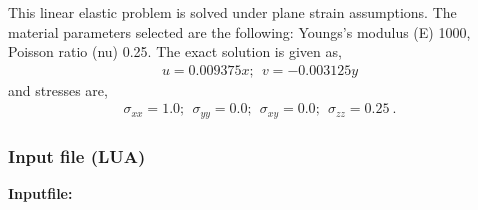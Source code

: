 This linear elastic problem is solved under
plane strain assumptions. The material parameters
selected are the following: Youngs's modulus (E)
1000, Poisson ratio (nu) 0.25. The exact solution 
is given as,
\begin{eqnarray}
  u = 0.009375x; ~~ v=-0.003125y \nonumber
\end{eqnarray} 
and stresses are,
\begin{eqnarray}
  \sigma_{xx} = 1.0;~~\sigma_{yy} = 0.0;~~
  \sigma_{xy} = 0.0;~~\sigma_{zz} = 0.25~. \nonumber
\end{eqnarray}

\clearpage
\subsubsection*{Input file (LUA)}
\begin{flushleft}
  \textbf{Inputfile:}
  \\
\end{flushleft}
\hspace{1in}
{\footnotesize
{}
}

